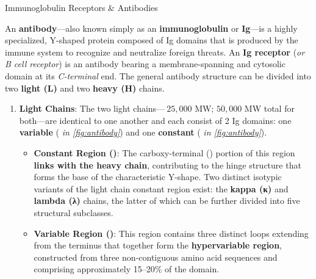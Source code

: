    \begin{core}[label=core:ig_receptor]{Immunoglobulin Receptors \& Antibodies}

      An \textbf{antibody}---also known simply as an \textbf{immunoglobulin} or \textbf{Ig}---is a highly specialized, Y-shaped protein composed of Ig domains that is produced by the immune system to recognize and neutralize foreign threats. An \textbf{Ig receptor} (\textit{or B cell receptor}) is an antibody bearing a membrane-spanning and cytosolic domain at its \textit{C-terminal} end. The general antibody structure can be divided into two \textbf{light (L)} and two \textbf{heavy (H)} chains.

      \begin{enumerate}

        \item \textbf{Light Chains}: The two light chains---$~25,000$ MW; $50,000$ MW total for both---are identical to one another and each consist of 2 Ig domains: one \textbf{variable} (\textit{ in \autoref{fig:antibody}}) and one \textbf{constant} (\textit{ in \autoref{fig:antibody}}).


          \begin{itemize}

            \item \textbf{Constant Region ()}: The carboxy-terminal () portion of this region \textbf{links with the heavy chain}, contributing to the hinge structure that forms the base of the characteristic Y-shape. Two distinct isotypic variants of the light chain constant region exist: the \textbf{kappa (κ)} and \textbf{lambda (λ)} chains, the latter of which can be further divided into five structural subclasses.

            \item \textbf{Variable Region ()}: This region contains three distinct loops extending from the terminus that together form the \textbf{hypervariable region}, constructed from three non-contiguous amino acid sequences and comprising approximately 15--20\% of the domain.

          \end{itemize}

\end{enumerate}
\end{core}
